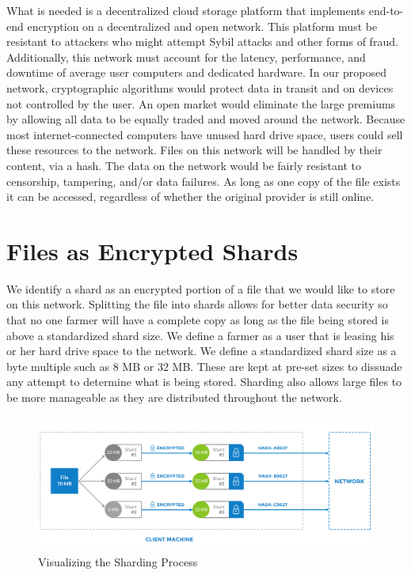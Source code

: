 \documentclass[a4paper,10pt]{article}
\begin{document}
What is needed is a decentralized cloud storage platform that implements end-to-end encryption on a decentralized and open network. This platform must be resistant to attackers who might attempt Sybil attacks and other forms of fraud. Additionally, this network must account for the latency, performance, and downtime of average user computers and dedicated hardware. In our proposed network, cryptographic algorithms would protect data in transit and on devices not controlled by the user. An open market would eliminate the large premiums by allowing all data to be equally traded and moved around the network. Because most internet-connected computers have unused hard drive space, users could sell these resources to the network. Files on this network will be handled by their content, via a hash. The data on the network would be fairly resistant to censorship, tampering, and/or data failures. As long as one copy of the file exists it can be accessed, regardless of whether the original provider is still online.\\

\section{Files as Encrypted Shards}
We identify a shard as an encrypted portion of a file that we would like to store on this network. Splitting the file into shards allows for better data security so that no one farmer will have a complete copy as long as the file being stored is above a standardized shard size. We define a farmer as a user that is leasing his or her hard drive space to the network. We define a standardized shard size as a byte multiple such as 8 MB or 32 MB. These are kept at pre-set sizes to dissuade any attempt to determine what is being stored. Sharding also allows large files to be more manageable as they are distributed throughout the network. 
\\
\begin{figure}[hbt]
\centering
\includegraphics[width=\linewidth]{1}
\caption{Visualizing the Sharding Process}
\end{figure}
\end{document}
